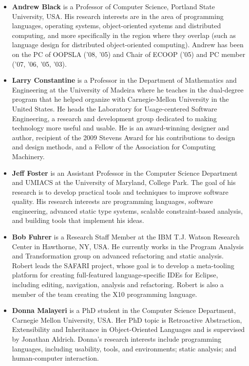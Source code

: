 \documentclass{acm_proc_article-sp}
\begin{document}
\begin{itemize}

\item \textbf{Andrew Black} is a Professor of Computer Science, Portland State University, USA. His research interests are in the area of programming languages, operating systems, object-oriented systems and distributed computing, and more specifically in the region where they overlap (such as language design for distributed object-oriented computing). Andrew has been on the PC of OOPSLA ('08, '05) and Chair of ECOOP ('05) and PC member ('07, '06, '05, '03).

\item \textbf{Larry Constantine} is a Professor in the Department of Mathematics and
Engineering at the University of Madeira where he teaches in the dual-degree
program that he helped organize with Carnegie-Mellon University in the
United States. He heads the Laboratory for Usage-centered Software
Engineering, a research and development group dedicated to making technology
more useful and usable. He is an award-winning designer and author,
recipient of the 2009 Stevens Award for his contributions to design and
design methods, and a Fellow of the Association for Computing Machinery.

\item \textbf{Jeff Foster} is an Assistant Professor in the Computer Science Department and UMIACS at the University of Maryland, College Park. The goal of his research is to develop practical tools and techniques to improve software quality. His research interests are programming languages, software engineering, advanced static type systems, scalable constraint-based analysis, and building tools that implement his ideas.

\item \textbf{Bob Fuhrer} is a Research Staff Member at the IBM T.J. Watson Research Center in Hawthorne, NY, USA. He currently works in the Program Analysis and Transformation group on advanced refactoring and static analysis. Robert leads the SAFARI project, whose goal is to develop a meta-tooling platform for creating full-featured language-specific IDEs for Eclipse, including editing, navigation, analysis and refactoring. Robert is also a member of the team creating the X10 programming language.

\item \textbf{Donna Malayeri} is a PhD student in the Computer Science Department, Carnegie Mellon University, USA. Her PhD topic is Retroactive Abstraction, Extensibility and Inheritance in Object-Oriented Languages and is supervised by Jonathan Aldrich. Donna's research interests include programming languages, including usability, tools, and environments; static analysis;  and human-computer interaction. 


\end{itemize}
\end{document}

